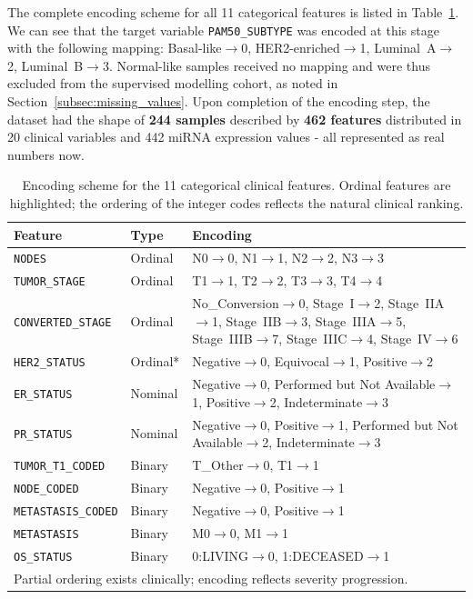 The complete encoding scheme for all 11 categorical features is listed in
Table~\ref{tab:encoding_scheme}. We can see that the target variable \texttt{PAM50\_SUBTYPE} was 
encoded at this stage with the following mapping:
Basal-like$\to$0, HER2-enriched$\to$1, Luminal~A$\to$2, Luminal~B$\to$3.
Normal-like samples received no mapping and were thus excluded from the
supervised modelling cohort, as noted in Section~\ref{subsec:missing_values}.
Upon completion of the encoding step, the dataset had the shape of \textbf{244
samples} described by \textbf{462 features} distributed in 20 clinical variables 
and 442
miRNA expression values - all represented as real numbers now.

\begin{table}[!ht]
\centering
\caption{Encoding scheme for the 11 categorical clinical features. Ordinal
features are highlighted; the ordering of the integer codes reflects the
natural clinical ranking.}
\label{tab:encoding_scheme}
\small
\begin{tabular}{p{3.8cm} p{1.5cm} p{7.0cm}}
\hline
\textbf{Feature} & \textbf{Type} & \textbf{Encoding} \\
\hline
\texttt{NODES}
    & Ordinal
    & N0$\to$0, N1$\to$1, N2$\to$2, N3$\to$3 \\
\texttt{TUMOR\_STAGE}
    & Ordinal
    & T1$\to$1, T2$\to$2, T3$\to$3, T4$\to$4 \\
\texttt{CONVERTED\_STAGE}
    & Ordinal
    & No\_Conversion$\to$0, Stage~I$\to$2, Stage~IIA$\to$1,
      Stage~IIB$\to$3, Stage~IIIA$\to$5, Stage~IIIB$\to$7,
      Stage~IIIC$\to$4, Stage~IV$\to$6 \\
\texttt{HER2\_STATUS}
    & Ordinal*
    & Negative$\to$0, Equivocal$\to$1, Positive$\to$2 \\
\texttt{ER\_STATUS}
    & Nominal
    & Negative$\to$0, Performed but Not Available$\to$1,
      Positive$\to$2, Indeterminate$\to$3 \\
\texttt{PR\_STATUS}
    & Nominal
    & Negative$\to$0, Positive$\to$1,
      Performed but Not Available$\to$2, Indeterminate$\to$3 \\
\texttt{TUMOR\_T1\_CODED}
    & Binary
    & T\_Other$\to$0, T1$\to$1 \\
\texttt{NODE\_CODED}
    & Binary
    & Negative$\to$0, Positive$\to$1 \\
\texttt{METASTASIS\_CODED}
    & Binary
    & Negative$\to$0, Positive$\to$1 \\
\texttt{METASTASIS}
    & Binary
    & M0$\to$0, M1$\to$1 \\
\texttt{OS\_STATUS}
    & Binary
    & 0:LIVING$\to$0, 1:DECEASED$\to$1 \\
\hline
\multicolumn{3}{l}{\footnotesize * Partial ordering exists clinically; encoding reflects severity progression.} \\
\end{tabular}
\end{table}

